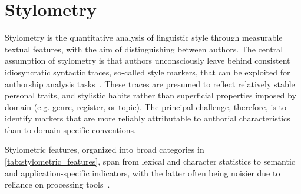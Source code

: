 \section{Stylometry}

Stylometry is the quantitative analysis of linguistic style through measurable textual features, with the aim of distinguishing between authors.
The central assumption of stylometry is that authors unconsciously leave behind consistent idiosyncratic syntactic traces, so-called style markers, that can be exploited for authorship analysis tasks~\citep{neal_surveying_2018,bischoff_importance_2020}. 
These traces are presumed to reflect relatively stable personal traits, and stylistic habits rather than superficial properties imposed by domain (e.g. genre, register, or topic). 
The principal challenge, therefore, is to identify markers that are more reliably attributable to authorial characteristics than to domain-specific conventions.

Stylometric features, organized into broad categories in \autoref{tab:stylometric_features}, span from lexical and character statistics to semantic and application-specific indicators, with the latter often being noisier due to reliance on processing tools~\citep{stamatatos_survey_2009}.



